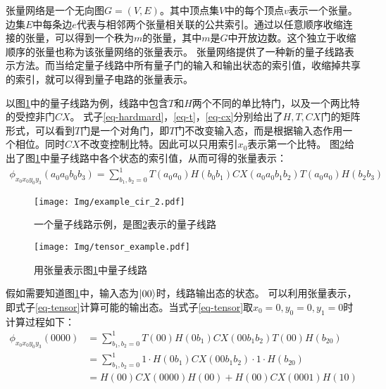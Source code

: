 张量网络是一个无向图\(G=\left(V,E\right)\)。其中顶点集$V$中的每个顶点$v$表示一个张量。边集\(E\)中每条边\(e\)代表与相邻两个张量相关联的公共索引。通过以任意顺序收缩连接的张量，可以得到一个秩为\(m\)的张量，其中\(m\)是$G$中开放边数。这个独立于收缩顺序的张量也称为该张量网络的张量表示\citep{biamonte2019lectures}。
张量网络提供了一种新的量子线路表示方法\citep{pednault2017breaking}。而当给定量子线路中所有量子门的输入和输出状态的索引值，收缩掉共享的索引，就可以得到量子电路的张量表示。
\begin{example}
    \label{ex-tensor}
    以图\ref{fig:example_cir_2}中的量子线路为例，线路中包含$T$和$H$两个不同的单比特门，以及一个两比特的受控非门$CX$。
式子\ref{eq-hardmard}，\ref{eq-t}，\ref{eq-cx}分别给出了$H,T,CX$门的矩阵形式，可以看到$T$门是一个对角门，即$T$门不改变输入态，而是根据输入态作用一个相位。同时$CX$不改变控制比特。因此可以只用索引$x_0$表示第一个比特。
图\ref{fig:example_cir_map}给出了图\ref{fig:example_cir_2}中量子线路中各个状态的索引值，从而可得的张量表示：
\begin{align}
\label{eq-tensor}
\phi_{x_0x_0y_0y_3}\left(a_0a_0b_0b_3\right)=\sum_{b_1,b_2=0}^{1}T\left(a_0a_0\right)H\left(b_0b_1\right)CX\left(a_0a_0b_1b_2\right)T\left(a_0a_0\right)H\left(b_2b_3\right)
    \end{align}
\begin{figure}[!htbp]
    \centering
    \texttt{[image: Img/example\_cir\_2.pdf]}
    \caption{一个量子线路示例，是图\ref{fig:example_cir_map}表示的量子线路}   
    \label{fig:example_cir_2}
\end{figure}
\begin{figure}[!htbp]
    \centering
    \texttt{[image: Img/tensor\_example.pdf]}
    \caption{用张量表示图\ref{fig:example_cir_2}中量子线路}   
    \label{fig:example_cir_map}
\end{figure}
假如需要知道图\ref{fig:example_cir_2}中，输入态为\(\ket{00}\)时，线路输出态的状态。
可以利用张量表示，即式子\ref{eq-tensor}计算可能的输出态。当式子\ref{eq-tensor}取\(x_0 = 0, y_0 = 0, y_1 = 0\)时计算过程如下：
\begin{equation}
    \begin{aligned}
\phi_{x_0x_0y_0y_3}\left(0000\right)&=\sum_{b_1,b_2=0}^{1}T\left(00\right)H\left(0b_1\right)CX\left(00b_1b_2\right)T\left(00\right)H\left(b_20\right)\\ 
    &=\sum_{b_1,b_2=0}^{1}1\cdot H\left(0b_1\right)CX\left(00b_1b_2\right)\cdot 1\cdot H\left(b_20\right)\\
        &=H\left(00\right)CX\left(0000\right)H\left(00\right)+H\left(00\right)CX\left(0001\right)H\left(10\right)\\

\end{aligned}
\end{equation}
\end{example}
